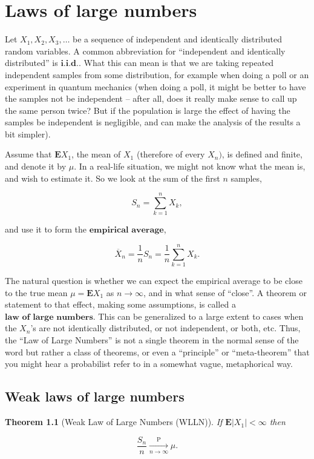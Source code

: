 \documentclass[11pt]{report}
\theoremstyle{plain}
\newtheorem{thm}{Theorem}[chapter]
\theoremstyle{definition}
\begin{document}
\chapter{Laws of large numbers}
Let $X_1, X_2, X_3, \ldots$ be a sequence of
independent and identically distributed random
variables. A common abbreviation for ``independent and
identically distributed'' is $\textbf{i.i.d.}$. What
this can mean is that we are taking repeated
independent samples from some distribution, for
example when doing a poll or an experiment in quantum
mechanics (when doing a poll, it might be better to
have the samples not be independent -- after all, does
it really make sense to call up the same person twice?
But if the population is large the effect of having
the samples be independent is negligible, and can make
the analysis of the results a bit simpler).

Assume that $\mathbf{E} X_1$, the mean of $X_1$
(therefore of every $X_n)$, is defined and finite,
and denote it by $\mu$. In a real-life situation, we
might not know what the mean is, and wish to estimate
it. So we look at the sum of the first $n$ samples,

\[
S_n = \sum_{k=1}^n X_k,
\]

and use it to form the $\textbf{empirical average}$,

\[
\overline{X}_n = \frac1n S_n = \frac{1}{n} \sum_{k=1}^n X_k.
\]

The natural question is whether we can expect the
empirical average to be close to the true mean
$\mu=\mathbf{E} X_1$ as $n\to\infty$, and in what
sense of ``close''. A theorem or statement to that
effect, making some assumptions, is called a
$\textbf{law of large numbers}$. This can be
generalized to a large extent to cases when the
$X_n$'s are not identically distributed, or not
independent, or both, etc. Thus, the ``Law of Large
Numbers'' is not a single theorem in the normal sense
of the word but rather a class of theorems, or even a
``principle'' or ``meta-theorem'' that you might hear
a probabilist refer to in a somewhat vague,
metaphorical way.

\section{Weak laws of large numbers}

\begin{thm}[Weak Law of Large Numbers (WLLN)]
\label{thm-wlln}
If $\mathbf{E}|X_1|<\infty$ then

\[
\frac{S_n}{n} \xrightarrow[n\to\infty]{\mathrm{P}} \mu.
\]

\end{thm}
\end{document}
